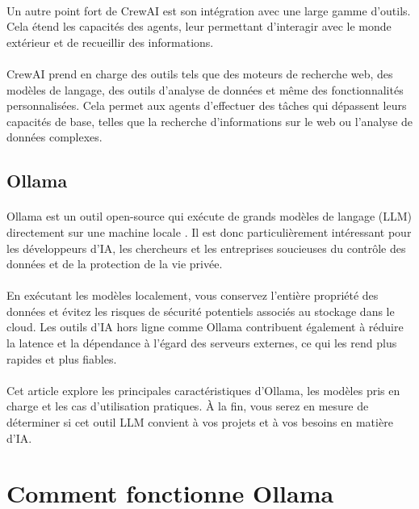 \paragraph{}
Un autre point fort de CrewAI est son intégration avec une large gamme d'outils. Cela étend les capacités des agents, leur permettant d'interagir avec le monde extérieur et de recueillir des informations.
\paragraph{}
CrewAI prend en charge des outils tels que des moteurs de recherche web, des modèles de langage, des outils d'analyse de données et même des fonctionnalités personnalisées. Cela permet aux agents d'effectuer des tâches qui dépassent leurs capacités de base, telles que la recherche d'informations sur le web ou l'analyse de données complexes.

\subsection{Ollama  }

\paragraph{}
Ollama est un outil open-source qui exécute de grands modèles de langage (LLM) directement sur une machine locale . Il est donc particulièrement intéressant pour les développeurs d’IA, les chercheurs et les entreprises soucieuses du contrôle des données et de la protection de la vie privée.
\paragraph{}
En exécutant les modèles localement, vous conservez l’entière propriété des données et évitez les risques de sécurité potentiels associés au stockage dans le cloud. Les outils d’IA hors ligne comme Ollama contribuent également à réduire la latence et la dépendance à l’égard des serveurs externes, ce qui les rend plus rapides et plus fiables.
\paragraph{}
Cet article explore les principales caractéristiques d’Ollama, les modèles pris en charge et les cas d’utilisation pratiques. À la fin, vous serez en mesure de déterminer si cet outil LLM convient à vos projets et à vos besoins en matière d’IA.

\section*{Comment fonctionne Ollama}

